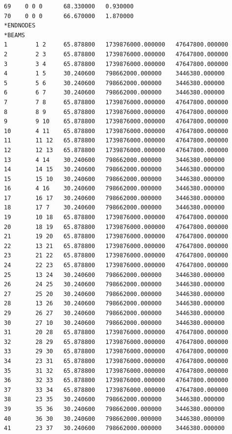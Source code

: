 \documentclass[10pt,a4paper,final]{report}
\begin{document}
\begin{lstlisting}
69 	  0 0 0 	 68.330000 	 0.930000
70 	  0 0 0 	 66.670000 	 1.870000
*ENDNODES
*BEAMS
1 	 	 1 2 	 65.878800 	 1739876000.000000 	 47647800.000000
2 	 	 2 3 	 65.878800 	 1739876000.000000 	 47647800.000000
3 	 	 3 4 	 65.878800 	 1739876000.000000 	 47647800.000000
4 	 	 1 5 	 30.240600 	 798662000.000000 	 3446380.000000
5 	 	 5 6 	 30.240600 	 798662000.000000 	 3446380.000000
6 	 	 6 7 	 30.240600 	 798662000.000000 	 3446380.000000
7 	 	 7 8 	 65.878800 	 1739876000.000000 	 47647800.000000
8 	 	 8 9 	 65.878800 	 1739876000.000000 	 47647800.000000
9 	 	 9 10 	 65.878800 	 1739876000.000000 	 47647800.000000
10 	 	 4 11 	 65.878800 	 1739876000.000000 	 47647800.000000
11 	 	 11 12 	 65.878800 	 1739876000.000000 	 47647800.000000
12 	 	 12 13 	 65.878800 	 1739876000.000000 	 47647800.000000
13 	 	 4 14 	 30.240600 	 798662000.000000 	 3446380.000000
14 	 	 14 15 	 30.240600 	 798662000.000000 	 3446380.000000
15 	 	 15 10 	 30.240600 	 798662000.000000 	 3446380.000000
16 	 	 4 16 	 30.240600 	 798662000.000000 	 3446380.000000
17 	 	 16 17 	 30.240600 	 798662000.000000 	 3446380.000000
18 	 	 17 7 	 30.240600 	 798662000.000000 	 3446380.000000
19 	 	 10 18 	 65.878800 	 1739876000.000000 	 47647800.000000
20 	 	 18 19 	 65.878800 	 1739876000.000000 	 47647800.000000
21 	 	 19 20 	 65.878800 	 1739876000.000000 	 47647800.000000
22 	 	 13 21 	 65.878800 	 1739876000.000000 	 47647800.000000
23 	 	 21 22 	 65.878800 	 1739876000.000000 	 47647800.000000
24 	 	 22 23 	 65.878800 	 1739876000.000000 	 47647800.000000
25 	 	 13 24 	 30.240600 	 798662000.000000 	 3446380.000000
26 	 	 24 25 	 30.240600 	 798662000.000000 	 3446380.000000
27 	 	 25 20 	 30.240600 	 798662000.000000 	 3446380.000000
28 	 	 13 26 	 30.240600 	 798662000.000000 	 3446380.000000
29 	 	 26 27 	 30.240600 	 798662000.000000 	 3446380.000000
30 	 	 27 10 	 30.240600 	 798662000.000000 	 3446380.000000
31 	 	 20 28 	 65.878800 	 1739876000.000000 	 47647800.000000
32 	 	 28 29 	 65.878800 	 1739876000.000000 	 47647800.000000
33 	 	 29 30 	 65.878800 	 1739876000.000000 	 47647800.000000
34 	 	 23 31 	 65.878800 	 1739876000.000000 	 47647800.000000
35 	 	 31 32 	 65.878800 	 1739876000.000000 	 47647800.000000
36 	 	 32 33 	 65.878800 	 1739876000.000000 	 47647800.000000
37 	 	 33 34 	 65.878800 	 1739876000.000000 	 47647800.000000
38 	 	 23 35 	 30.240600 	 798662000.000000 	 3446380.000000
39 	 	 35 36 	 30.240600 	 798662000.000000 	 3446380.000000
40 	 	 36 30 	 30.240600 	 798662000.000000 	 3446380.000000
41 	 	 23 37 	 30.240600 	 798662000.000000 	 3446380.000000

\end{lstlisting}
\end{document}
